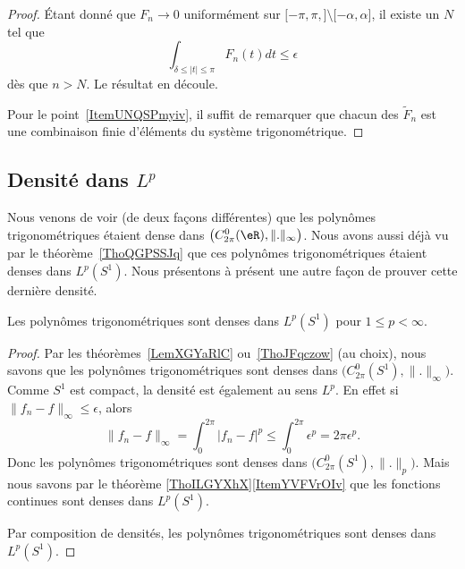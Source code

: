 \begin{proof}
	Étant donné que \( F_n\to 0\) uniformément sur \( \mathopen[ -\pi,\pi ,  \mathclose]\setminus\mathopen[ -\alpha , \alpha \mathclose]\), il existe un \( N\) tel que
	\begin{equation}
		\int_{\delta\leq| t |\leq \pi}F_n(t)dt\leq \epsilon
	\end{equation}
	dès que \( n>N\). Le résultat en découle.

	Pour le point~\ref{ItemUNQSPmyiv}, il suffit de remarquer que chacun des \( \tilde F_n\) est une combinaison finie d'éléments du système trigonométrique.
\end{proof}


\subsection{Densité dans \texorpdfstring{$ L^p$}{Lp}}

Nous venons de voir (de deux façons différentes) que les polynômes trigonométriques étaient dense dans \( \big( C^0_{2\pi}(\eR),\| . \|_{\infty} \big)\). Nous avons aussi déjà vu par le théorème~\ref{ThoQGPSSJq} que ces polynômes trigonométriques étaient denses dans \( L^p(S^1)\). Nous présentons à présent une autre façon de prouver cette dernière densité.

\begin{theorem}     \label{ThoDPTwimI}
	Les polynômes trigonométriques sont denses dans \( L^p(S^1)\) pour \( 1\leq p <\infty\).
\end{theorem}

\begin{proof}
	Par les théorèmes~\ref{LemXGYaRlC} ou~\ref{ThoJFqczow} (au choix), nous savons que les polynômes trigonométriques sont denses dans \( \big( C^0_{2\pi}(S^1),\| . \|_{\infty} \big)\). Comme \( S^1\) est compact, la densité est également au sens \( L^p\). En effet si \( \| f_n-f \|_{\infty}\leq \epsilon\), alors
	\begin{equation}
		\| f_n-f \|_{\infty}=\int_0^{2\pi}| f_n-f |^p\leq\int_0^{2\pi}\epsilon^p=2\pi\epsilon^p.
	\end{equation}
	Donc les polynômes trigonométriques sont denses dans \( \big( C^0_{2\pi}(S^1),\| . \|_p \big)\). Mais nous savons par le théorème \ref{ThoILGYXhX}\ref{ItemYVFVrOIv} que les fonctions continues sont denses dans \( L^p(S^1)\).

	Par composition de densités, les polynômes trigonométriques sont denses dans \( L^p(S^1)\).
\end{proof}

